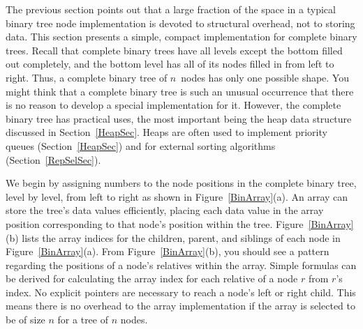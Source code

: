 The previous section points out that a large
fraction of the space in a typical binary tree node implementation is
devoted to structural overhead, not to storing data.
This section presents a simple, compact implementation
for complete binary trees.
Recall that complete binary trees have all levels except the bottom
filled out completely, and the bottom level has all of its nodes filled
in from left to right.
Thus, a complete binary tree of \(n\)~nodes has only one possible shape.
You might think that a complete binary tree is such an unusual
occurrence that there is no reason to develop a special
implementation for it.
However, the complete binary tree has practical uses, the most
important being the heap data structure discussed in
Section~\ref{HeapSec}.
Heaps are often used to implement priority queues
(Section~\ref{HeapSec}) and for external sorting algorithms
(Section~\ref{RepSelSec}).

We begin by assigning numbers to the node positions in the complete
binary tree, level by level, from left to right as shown in
Figure~\ref{BinArray}(a). 
An array can store the tree's data values efficiently, placing
each data value in the array position corresponding to that node's
position within the tree.
Figure~\ref{BinArray}(b) lists the array indices for the
children, parent, and siblings of each node in
Figure~\ref{BinArray}(a).
From Figure~\ref{BinArray}(b), you should see a pattern regarding the
positions of a node's relatives within the array.
Simple formulas can be derived for calculating the array index
for each relative of a node \(r\) from \(r\)'s index.
No explicit pointers are necessary to reach a node's left or
right child.
This means there is no overhead to the array implementation if the
array is selected to be of size \(n\) for a tree of \(n\) nodes.

